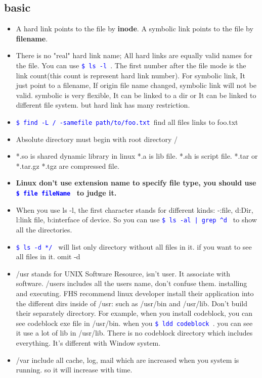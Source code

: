 \documentclass[a4paper,12pt,twoside]{book}
\newcommand{\linuxcommand}[1]{\texttt{\textcolor{blue}{\$ #1 \Pisymbol{psy}{191}}}}
\begin{document}
\subsection{basic}
\begin{itemize}
\item A hard link points to the file by \textbf{inode}.  A symbolic link points to the file by \textbf{filename}. 
 
\item  There is no "real" hard link name; All hard links are equally valid names for the file. You can use \linuxcommand{ls -l}. The first number after the file mode is the link count(this count is represent hard link number).  For symbolic link, It just point to a filename, If origin file name changed, symbolic link will not be valid.   symbolic is very flexible,  It can be linked to a dir or It can be linked to different file system. but hard link has many restriction. 

\item \linuxcommand{find -L / -samefile path/to/foo.txt}find all files links to foo.txt

\item Absolute directory must begin with root directory /
    \item *.so is shared dynamic library in linux *.a is lib file.  *.sh is script file. *.tar or
        *.tar.gz *.tgz are compressed file.

     \item \textbf{Linux don't use extension name to specify file type, you should use \linuxcommand{file fileName} to judge it. }
     
	 \item When you use ls -l, the first character stands for different kinds: -:file, d:Dir,
         l:link file, b:interface of device. So you can use \linuxcommand{ls -al | grep \^{}d} to show all the directories. 
	 
    \item \linuxcommand{ls -d */} will list only directory without all files in it. if you want to see all files in it. omit -d
 
   \item /usr stands for UNIX Software Resource, isn't user. It associate with software. /users includes all the users name, don't confuse them. 
         installing and executing. FHS recommend linux developer install their application into the different dirs inside of /usr:  such as /usr/bin and /usr/lib. Don't build their separately directory.  For example, when you install codeblock, you can see codeblock exe file in /usr/bin. when you \linuxcommand{ldd codeblock}. you can see it use a lot of lib in /usr/lib. There is no codeblock directory which includes everything.  It's different with Window system.
         \item /var include all cache, log, mail which are increased when you system is running. so it will increase with time. 
         

\end{itemize}
\end{document}
